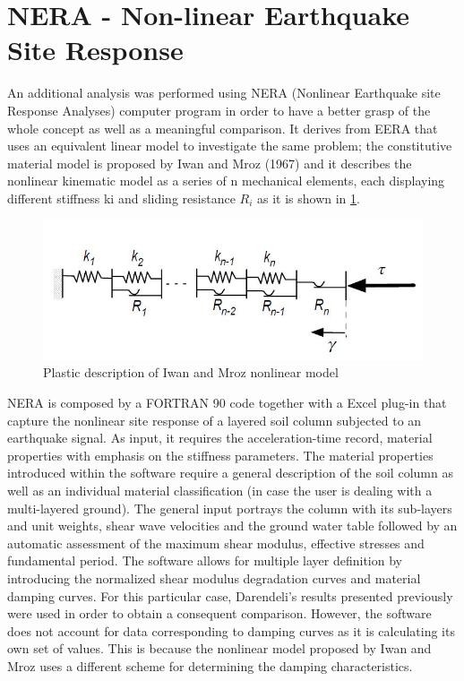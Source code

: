 \documentclass[10pt,a4paper]{report}
\begin{document}
\section{NERA - Non-linear Earthquake Site Response}
An additional analysis was performed using NERA (Nonlinear Earthquake site Response Analyses) computer program in order to have a better grasp of the whole concept as well as a meaningful comparison. It derives from EERA that uses an equivalent linear model to investigate the same problem; the constitutive material model is proposed by Iwan and Mroz (1967) and it describes the nonlinear kinematic model as a series of n mechanical elements, each displaying different stiffness ki and sliding resistance $R_i$ as it is shown in \ref{Mroz}.
\begin{figure}[h!]
	\centering
	\includegraphics[width=0.7\linewidth]{"Mroz"}
	\caption[]{Plastic description of Iwan and Mroz nonlinear model}
	\label{Mroz}
\end{figure}

NERA is composed by a FORTRAN 90 code together with a Excel plug-in that capture the nonlinear site response of a layered soil column subjected to an earthquake signal. As input, it requires the acceleration-time record, material properties with emphasis on the stiffness parameters. 
The material properties introduced within the software require a general description of the soil column as well as an individual material classification (in case the user is dealing with a multi-layered ground). The general input portrays the column with its sub-layers and unit weights, shear wave velocities and the ground water table followed by an automatic assessment of the maximum shear modulus, effective stresses and fundamental period. 
The software allows for multiple layer definition by introducing the normalized shear modulus degradation curves and material damping curves. For this particular case, Darendeli's results presented previously were used in order to obtain a consequent comparison. However, the software does not account for data corresponding to damping curves as it is calculating its own set of values. This is because the nonlinear model proposed by Iwan and Mroz uses a different scheme for determining the damping characteristics.
\end{document}
